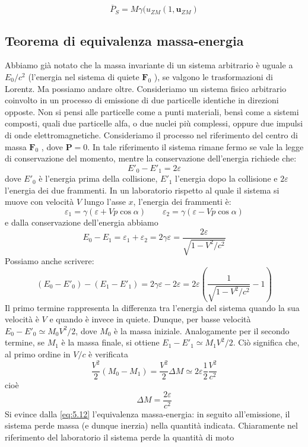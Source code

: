 \documentclass[a4paper,11pt]{book}
\theoremstyle{plain}
\theoremstyle{definition}
\begin{document}
\begin{equation}
\overline{P}_S = M \gamma(u_{ZM} (1,\textbf{u}_{ZM})
\end{equation}

\subsection{Teorema di equivalenza massa-energia}
Abbiamo già notato che la massa invariante di un sistema arbitrario è uguale a $E_0 /c^2$ 
(l'energia nel sistema di quiete $\textbf{F}_0$ ), se valgono le trasformazioni di Lorentz. Ma possiamo 
andare oltre. Consideriamo un sistema fisico arbitrario coinvolto in un processo di emissione di due particelle identiche in direzioni opposte. Non si pensi alle particelle come a punti materiali, bensì come a sistemi composti, quali due particelle alfa, o due nuclei più complessi, oppure due impulsi di onde elettromagnetiche. Consideriamo il processo 
nel riferimento del centro di massa $\textbf{F}_0$ , dove $\textbf{P} = 0$. In tale riferimento il sistema rimane 
fermo se vale la legge di conservazione del momento, mentre la conservazione dell'energia 
richiede che:
\[
E'_0-E'_1 = 2\varepsilon
\]
dove $E'_0$ è l'energia prima della collisione, $E'_1$ l'energia dopo la collisione e $2\varepsilon$ l'energia dei due frammenti. In un laboratorio rispetto al quale il sistema si muove con velocità $V$ lungo l'asse $x$, l'energia dei frammenti è:
\[
\varepsilon_1 = \gamma(\varepsilon+Vp\cos\alpha) \qquad \varepsilon_2 = \gamma(\varepsilon-Vp\cos\alpha)
\]
e dalla conservazione dell'energia abbiamo
\[
E_0-E_1 = \varepsilon_1 +\varepsilon_2 = 2\gamma\varepsilon = \frac{2\varepsilon}{\sqrt{1-V^2/c^2}}
\]
Possiamo anche scrivere:
\[
(E_0-E'_0) - (E_1-E'_1) = 2\gamma\varepsilon-2\varepsilon = 2\varepsilon \left( \frac{1}{\sqrt{1-V^2/c^2}}-1 \right)
\]
Il primo termine rappresenta la differenza tra l'energia del sistema quando la sua velocità è $V$ e quando è invece in quiete. Dunque, per basse velocità $E_0-E'_0 \simeq M_0V^2/2$, dove $M_0$ è la massa iniziale. Analogamente per il secondo termine, se $M_1$ è la massa finale, si ottiene $E_1-E'_1 \simeq M_1V^2/2$. Ciò significa che, al primo ordine in $V/c$ è verificata
\[
\frac{V^2}{2} (M_0 - M_1) = \frac{V^2}{2}\Delta M \simeq 2\varepsilon \frac{1}{2}\frac{V^2}{c^2}
\]
cioè
\begin{equation}\label{eq:5.12}
\Delta M = \frac{2\varepsilon}{c^2}
\end{equation}
Si evince dalla \eqref{eq:5.12} l'equivalenza massa-energia: in seguito all'emissione, il sistema perde massa (e dunque inerzia) nella quantità indicata. Chiaramente nel riferimento del laboratorio il sistema perde la quantità di moto
\end{document}
